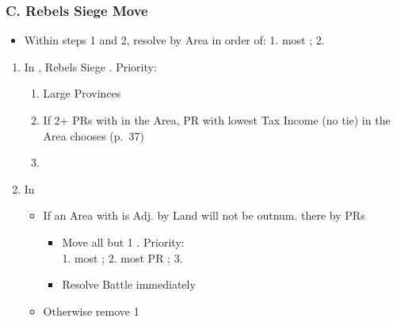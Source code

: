 \documentclass[10pt]{article}
\begin{document}
\subsubsection*{C. Rebels Siege  Move}
\begin{itemize}
	\item Within steps 1 and 2, resolve by Area in order of: 1. most \rebels; 2. \az
\end{itemize}
\begin{enumerate}[label=\strong{\arabic*.}]
	\item In , Rebels Siege \unrest. Priority:
	\begin{enumerate}[label=\arabic*.]
		\item Large Provinces
		\item If 2+ PRs with \unrest in the Area, PR with lowest Tax Income (no tie) in the Area chooses (p.~37)
		\item \az
	\end{enumerate}
	\framebreak
	\item In 
	\begin{itemize}
		\item If an Area with \unrest is Adj. by Land  \rebels will not be outnum. there by PRs
		\begin{itemize}
			\item Move all but 1 \rebel. Priority:\\ 1. most \unrest; 2. most PR \towns; 3. \az
			\item Resolve Battle immediately
		\end{itemize}
		\item Otherwise remove 1\rebel
	\end{itemize}
\end{enumerate}
\end{document}
